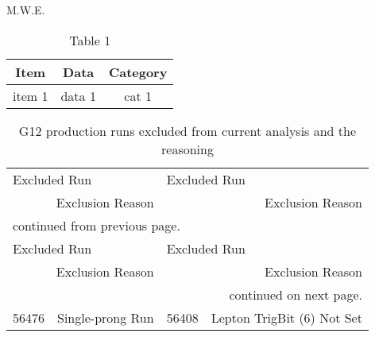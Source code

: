 \documentclass[12pt,a4paper]{report}
\author{Michael C. Kunkel}
\begin{document}
M.W.E.

\listoftables
 
\newpage
\begin{table}[h!]
\begin{minipage}{\textwidth}
\begin{center}


\caption[Table 1]{\label{tab:eff_events}Table 1 \vspace{0.75mm}}

\begin{tabular}{c|c|c}

\hline
Item & Data & Category \\
\hline
item 1 & data 1& cat 1 \\
\hline \hline
\end{tabular}

\end{center}
\end{minipage}
\end{table}





\begin{center}
\begin{longtable}{lr||lr}
\caption[G12 Production Run List Excluded From Current Analysis]{\label{tab:excluded_runs}G12 production runs excluded from current analysis and the reasoning}\\ %

\hline \hline
\multicolumn{2}{l||}{Excluded Run}  & \multicolumn{2}{l}{Excluded Run} \\
\multicolumn{2}{r||}{Exclusion Reason} & \multicolumn{2}{r}{Exclusion Reason} \\
\hline
\endfirsthead

\multicolumn{4}{l}{\scriptsize continued from previous page.} \\
\hline
\multicolumn{2}{l||}{Excluded Run}  & \multicolumn{2}{l}{Excluded Run} \\
\multicolumn{2}{r||}{Exclusion Reason}  & \multicolumn{2}{r}{Exclusion Reason} \\
\hline
\endhead

\hline
\multicolumn{4}{r}{\scriptsize continued on next page.} \\
\endfoot

\hline \hline
\endlastfoot

56476	&	 Single-prong Run 		&	56408	&	  Lepton TrigBit (6) Not Set 	\\


\end{longtable}
\end{center}
\end{document}
